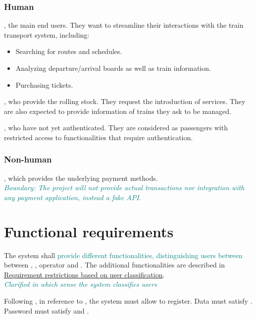 \subsubsection*{Human}
, the main end users. They want to streamline their interactions with the train transport system, including:
\begin{itemize}
	\item Searching for routes and schedules.
	\item Analyzing departure/arrival boards as well as train information.
	\item Purchasing tickets.
\end{itemize}

\noindent{}, who provide the rolling stock. They request the introduction of services. They are also expected to provide information of trains they ask to be managed.

\noindent{}, who have not yet authenticated. They are considered as passengers with restricted access to functionalities that require authentication.

\subsubsection*{Non-human}
, which provides the underlying payment methods.\\

\textcolor{teal}{\it{Boundary:} The project will not provide actual transactions nor integration with any payment application, instead a fake API.}

\newpage

\section{Functional requirements}
The system shall \textcolor{teal}{provide different functionalities, distinguishing users between} between , ,  operator and . 
The additional functionalities are described in 
\hyperref[Table1]{Requirement restrictions based on user classification}.\\
\textit{\textcolor{teal}{Clarified in which sense the system classifies users}}

Following , in reference to , the system must allow  to register. Data must 
satisfy . Password must satisfy  and .

